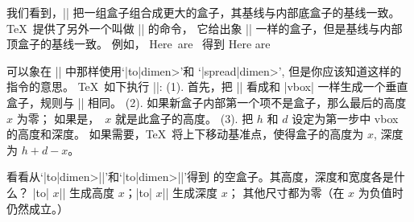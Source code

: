 \danger 我们看到，|\vbox| 把一组盒子组合成更大的盒子，其基线与内部底盒子的基线一致。%
\TeX\ 提供了另外一个叫做 |\vtop| 的命令，
它给出象 |\vbox| 一样的盒子，但是基线与内部顶盒子的基线一致。%
例如，
\begintt
\hbox{Here are }
\endtt
得到
\begindisplay
Here are 
\enddisplay

\ddanger 可以象在 |\vbox| 中那样使用`|\vtop to|\<dimen>'和%
`|\vtop spread|\<dimen>', 但是你应该知道这样的指令的意思。%
\TeX\ 如下执行 |\vtop|:
(1). 首先，把 |\vtop| 看成和 |vbox| 一样生成一个垂直盒子，规则与 |\vbox| 相同。%
(2). 如果新盒子内部第一个项不是盒子，那么最后的高度 $x$ 为零；
如果是，~$x$ 就是此盒子的高度。%
(3). 把 $h$ 和 $d$ 设定为第一步中 vbox 的高度和深度。%
如果需要，\TeX\ 将上下移动基准点，使得盒子的高度为 $x$, 深度为 $h+d-x$。

\ddangerexercise \1看看从`|\vbox to|\<dimen>|{}|'和`|\vtop to|\<dimen>|{}|'得到%
的空盒子。其高度，深度和宽度各是\hbox{什么？}
\answer |\vbox to| $x$|{}| 生成高度 $x$；|\vtop to| $x$|{}| 生成深度 $x$；
其他尺寸都为零（在 $x$ 为负值时仍然成立。）

